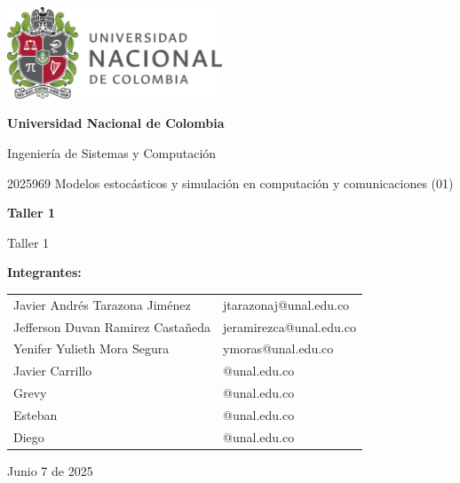 \documentclass{article}
\begin{document}
\begin{titlepage}
    \centering
    \includegraphics[width=0.48\textwidth]{logo_universidad.png}
    \par\vspace{2cm}

    {\Large \textbf{Universidad Nacional de Colombia} \par}
    \vspace{0.5cm}
    {\large Ingeniería de Sistemas y Computación \par}
    {\large 2025969 Modelos estocásticos y simulación en computación y comunicaciones (01)\par}
    \vspace{3cm}

    {\large \textbf{Taller 1} \par}
    {\large Taller 1 \par}
    \vspace{3cm}

    {\large \textbf{Integrantes:} \par}
    \vspace{0.5cm}
    \begin{tabular}{ll}
    Javier Andrés Tarazona Jiménez & jtarazonaj@unal.edu.co \\
    Jefferson Duvan Ramirez Castañeda & jeramirezca@unal.edu.co \\
    Yenifer Yulieth Mora Segura & ymoras@unal.edu.co \\
    Javier Carrillo & @unal.edu.co \\
    Grevy & @unal.edu.co \\
    Esteban & @unal.edu.co \\
    Diego & @unal.edu.co \\
    \end{tabular}
    \par\vspace{3cm}

    {\large Junio 7 de 2025 \par}
\end{titlepage}
\end{document}
